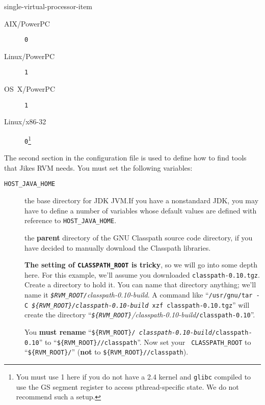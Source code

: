 \begin{enumerate}
\begin{Label}{single-virtual-processor-item}
\begin{description}
\item[AIX/PowerPC] \texttt{0 }
\item[Linux/PowerPC] \texttt{1}
\item[OS~X/PowerPC] \texttt{1}
\item[Linux/x86-32] \texttt{0}\footnote{You must use 1 here if you do not
have a 2.4 kernel and \texttt{glibc} compiled to use the GS segment register to
access pthread-specific state.  We do not recommend such a setup.}
\end{description}                
\end{Label}

The second section in the configuration file is used to define how to
find tools that Jikes RVM needs. You must set the following variables:

\begin{description}

\item[\texttt{HOST\_JAVA\_HOME}] the base directory for JDK JVM.\@  If you
have a nonstandard JDK, you may have to define a number of variables
whose default values are defined with reference to \texttt{HOST\_JAVA\_HOME}.

\label{manual-classpath-root}%
\item[] the {\bf parent} directory of the GNU
  Classpath source code directory, if you have decided to manually
  download the Classpath libraries. 

{\bf The setting of \texttt{CLASSPATH\_ROOT} is tricky}, so we will go
into some depth here.  For this example, we'll assume you downloaded
\texttt{classpath-0.10.tgz}.  Create a directory to hold it.  You can
name that directory anything; we'll name it 
{\it \texttt{\$RVM\_\-ROOT/}classpath-0.10-build}.  
A command like 
``\texttt{/usr/gnu/tar -C
  {\rm \it \texttt{\$\{RVM\_\-ROOT\}/}\-classpath-0.10-build} xzf classpath-0.10.tgz}''
will create the directory
``{\rm \it \texttt{\$\{RVM\_\-ROOT\}}/\-class\-path-0.10-build}\texttt{/\-class\-path-0.10}''.  

You {\bf must rename} ``\texttt{\$\{RVM\_\-ROOT\}/{\it
    class\-path-0.10-build}/\-class\-path-0.10}'' to ``\texttt{\$\{RVM\_\-ROOT\}//\-class\-path}''.  Now set your {\tt
  CLASS\-PATH\_\-ROOT} to ``\texttt{\$\{RVM\_\-ROOT\}/}''
({\bf not} to \texttt{\$\{RVM\_\-ROOT\}//\-class\-path}).



\end{description}
\end{enumerate}
